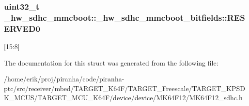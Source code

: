 \subsubsection[{\texorpdfstring{R\+E\+S\+E\+R\+V\+E\+D0}{RESERVED0}}]{\setlength{\rightskip}{0pt plus 5cm}uint32\+\_\+t \+\_\+hw\+\_\+sdhc\+\_\+mmcboot\+::\+\_\+hw\+\_\+sdhc\+\_\+mmcboot\+\_\+bitfields\+::\+R\+E\+S\+E\+R\+V\+E\+D0}\hypertarget{struct__hw__sdhc__mmcboot_1_1__hw__sdhc__mmcboot__bitfields_af99ff04a15950a16d26608975c4d9dbe}{}\label{struct__hw__sdhc__mmcboot_1_1__hw__sdhc__mmcboot__bitfields_af99ff04a15950a16d26608975c4d9dbe}
\mbox{[}15\+:8\mbox{]} 

The documentation for this struct was generated from the following file\+:\begin{DoxyCompactItemize}
\item 
/home/erik/proj/piranha/code/piranha-\/ptc/src/receiver/mbed/\+T\+A\+R\+G\+E\+T\+\_\+\+K64\+F/\+T\+A\+R\+G\+E\+T\+\_\+\+Freescale/\+T\+A\+R\+G\+E\+T\+\_\+\+K\+P\+S\+D\+K\+\_\+\+M\+C\+U\+S/\+T\+A\+R\+G\+E\+T\+\_\+\+M\+C\+U\+\_\+\+K64\+F/device/device/\+M\+K64\+F12/M\+K64\+F12\+\_\+sdhc.\+h\end{DoxyCompactItemize}
